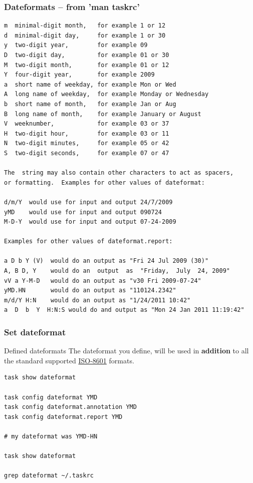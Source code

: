 \documentclass[t,handout]{beamer}
\begin{document}
\begin{frame}[fragile]\frametitle{Dateformats -- from 'man taskrc'}
    \begin{lstlisting}
m  minimal-digit month,   for example 1 or 12
d  minimal-digit day,     for example 1 or 30
y  two-digit year,        for example 09
D  two-digit day,         for example 01 or 30
M  two-digit month,       for example 01 or 12
Y  four-digit year,       for example 2009
a  short name of weekday, for example Mon or Wed
A  long name of weekday,  for example Monday or Wednesday
b  short name of month,   for example Jan or Aug
B  long name of month,    for example January or August
V  weeknumber,            for example 03 or 37
H  two-digit hour,        for example 03 or 11
N  two-digit minutes,     for example 05 or 42
S  two-digit seconds,     for example 07 or 47

The  string may also contain other characters to act as spacers,
or formatting.  Examples for other values of dateformat:

d/m/Y  would use for input and output 24/7/2009
yMD    would use for input and output 090724
M-D-Y  would use for input and output 07-24-2009

Examples for other values of dateformat.report:

a D b Y (V)  would do an output as "Fri 24 Jul 2009 (30)"
A, B D, Y    would do an  output  as  "Friday,  July  24, 2009"
vV a Y-M-D   would do an output as "v30 Fri 2009-07-24"
yMD.HN       would do an output as "110124.2342"
m/d/Y H:N    would do an output as "1/24/2011 10:42"
a  D  b  Y  H:N:S would do and output as "Mon 24 Jan 2011 11:19:42"\end{lstlisting}
\end{frame}

\begin{frame}[fragile]\frametitle{Set dateformat}
    \begin{alertblock}{Defined dateformats}
        The dateformat you define, will be used in \textbf{addition} to all the standard supported \href{https://en.wikipedia.org/wiki/ISO_8601}{ISO-8601} formats.
    \end{alertblock}

    \vfill
    \begin{lstlisting}
task show dateformat

task config dateformat YMD
task config dateformat.annotation YMD
task config dateformat.report YMD

# my dateformat was YMD-HN

task show dateformat

grep dateformat ~/.taskrc\end{lstlisting}
\end{frame}
\end{document}
